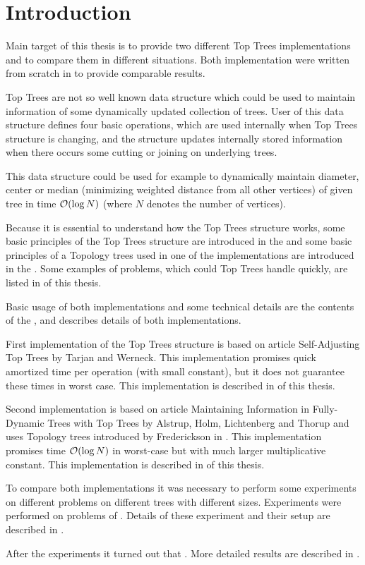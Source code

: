 \chapter*{Introduction}

Main target of this thesis is to provide two different {\I Top Trees}
implementations and to compare them in different situations. Both implementation
were written from scratch in \Cpp{} to provide comparable results.

{\I Top Trees} are not so well known data structure which could be used to
maintain information of some dynamically updated collection of trees. User of
this data structure defines four basic operations, which are used internally
when Top Trees structure is changing, and the structure updates internally
stored information when there occurs some cutting or joining on underlying
trees.

This data structure could be used for example to dynamically maintain diameter,
center or median (minimizing weighted distance from all other vertices) of given
tree in time ${\cal O}(\log N)$ (where $N$ denotes the number of vertices).

Because it is essential to understand how the Top Trees structure works, some
basic principles of the Top Trees structure are introduced in the 
and some basic principles of a Topology trees used in one of the implementations
are introduced in the . Some examples of problems, which could Top
Trees handle quickly, are listed in  of this thesis.

Basic usage of both implementations and some technical details are the contents
of the ,  and
 describes details of both implementations.

First implementation of the Top Trees structure is based on article {\I
Self-Adjusting Top Trees} \cite{SelfAdjustingTT} by Tarjan and Werneck. This
implementation promises quick amortized time per operation (with small
constant), but it does not guarantee these times in worst case. This
implementation is described in  of this thesis.

Second implementation is based on article {\I Maintaining Information in Fully-
Dynamic Trees with Top Trees} \cite{TopTrees} by Alstrup, Holm, Lichtenberg and
Thorup and uses Topology trees introduced by Frederickson in
\cite{DSforDynamicallyMaintainingRootedTrees}. This implementation promises time
${\cal O}(\log N)$ in worst-case but with much larger multiplicative constant. This
implementation is described in  of this thesis.

To compare both implementations it was necessary to perform some experiments on
different problems on different trees with different sizes. Experiments were
performed on problems of . Details of these experiment
and their setup are described in .

After the experiments it turned out that
.
More detailed results are described in .
